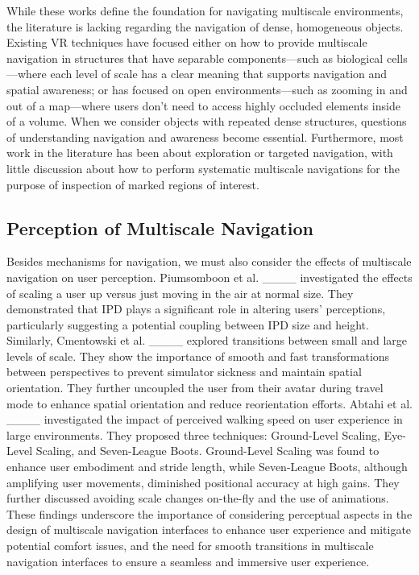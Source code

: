 While these works define the foundation for navigating multiscale environments, the literature is lacking regarding the navigation of dense, homogeneous objects. Existing VR techniques have focused either on how to provide multiscale navigation in structures that have separable components---such as biological cells---where each level of scale has a clear meaning that supports navigation and spatial awareness; or has focused on open environments—such as zooming in and out of a map—where users don’t need to access highly occluded elements inside of a volume. When we consider objects with repeated dense structures, questions of understanding navigation and awareness become essential. Furthermore, most work in the literature has been about exploration or targeted navigation, with little discussion about how to perform systematic multiscale navigations for the purpose of inspection of marked regions of interest.

\subsection{Perception of Multiscale Navigation}
Besides mechanisms for navigation, we must also consider the effects of multiscale navigation on user perception. Piumsomboon et al. ____ investigated the effects of scaling a user up versus just moving in the air at normal size. They demonstrated that IPD plays a significant role in altering users' perceptions, particularly suggesting a potential coupling between IPD size and height. Similarly, Cmentowski et al. ____ explored transitions between small and large levels of scale. They show the importance of smooth and fast transformations between perspectives to prevent simulator sickness and maintain spatial orientation. They further uncoupled the user from their avatar during travel mode to enhance spatial orientation and reduce reorientation efforts. Abtahi et al.  ____ investigated the impact of perceived walking speed on user experience in large environments. They proposed three techniques: Ground-Level  Scaling, Eye-Level Scaling, and Seven-League Boots. Ground-Level Scaling was found to enhance user embodiment and stride length, while Seven-League Boots, although amplifying user movements, diminished positional accuracy at high gains. They further discussed avoiding scale changes on-the-fly and the use of animations. These findings underscore the importance of considering perceptual aspects in the design of multiscale navigation interfaces to enhance user experience and mitigate potential comfort issues, and the need for smooth transitions in multiscale navigation interfaces to ensure a seamless and immersive user experience.

